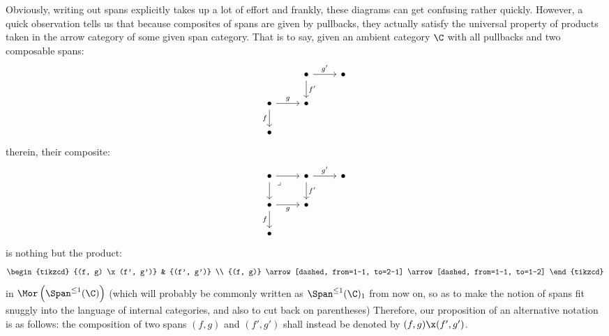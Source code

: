             \begin{convention} \label{conv: span_notations}
                Obviously, writing out spans explicitly takes up a lot of effort and frankly, these diagrams can get confusing rather quickly. However, a quick observation tells us that because composites of spans are given by pullbacks, they actually satisfy the universal property of products taken in the arrow category of some given span category. That is to say, given an ambient category $\C$ with all pullbacks and two composable spans:
                    $$
                        \begin{tikzcd}
                        	& \bullet & \bullet \\
                        	\bullet & \bullet \\
                        	\bullet
                        	\arrow["f"', from=2-1, to=3-1]
                        	\arrow["g", from=2-1, to=2-2]
                        	\arrow["{f'}", from=1-2, to=2-2]
                        	\arrow["{g'}", from=1-2, to=1-3]
                        \end{tikzcd}
                    $$
                therein, their composite:
                    $$
                        \begin{tikzcd}
                        	\bullet & \bullet & \bullet \\
                        	\bullet & \bullet \\
                        	\bullet
                        	\arrow["f"', from=2-1, to=3-1]
                        	\arrow["g"', from=2-1, to=2-2]
                        	\arrow["{f'}", from=1-2, to=2-2]
                        	\arrow["{g'}", from=1-2, to=1-3]
                        	\arrow[from=1-1, to=2-1]
                        	\arrow[from=1-1, to=1-2]
                        	\arrow["\lrcorner"{anchor=center, pos=0.125}, draw=none, from=1-1, to=2-2]
                        \end{tikzcd}
                    $$
                is nothing but the product:
                    $$
                        \begin{tikzcd}
                        	{(f, g) \x (f', g')} & {(f', g')} \\
                        	{(f, g)}
                        	\arrow[dashed, from=1-1, to=2-1]
                        	\arrow[dashed, from=1-1, to=1-2]
                        \end{tikzcd}
                    $$
                in $\Mor\left(\Span^{\leq 1}(\C)\right)$ (which will probably be commonly written as $\Span^{\leq 1}(\C)_1$ from now on, so as to make the notion of spans fit snuggly into the language of internal categories, and also to cut back on parentheses) Therefore, our proposition of an alternative notation is as follows: the composition of two spans $(f, g)$ and $(f', g')$ shall instead be denoted by $(f, g) \x (f', g')$.
            \end{convention}
